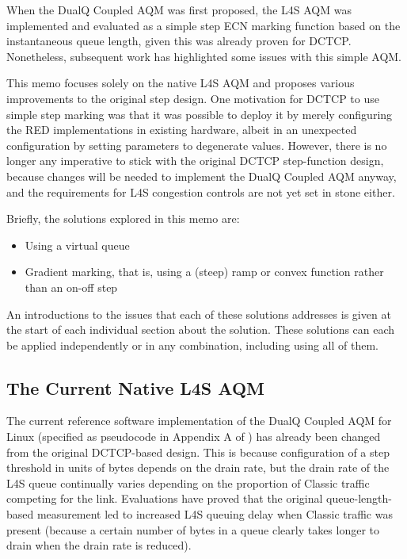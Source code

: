 When the DualQ Coupled AQM was first proposed, the L4S AQM was implemented and evaluated as a simple step ECN marking function based on the instantaneous queue length, given this was already proven for DCTCP. Nonetheless, subsequent work has highlighted some issues with this simple AQM. 

This memo focuses solely on the native L4S AQM and proposes various improvements to the original step design. One motivation for DCTCP to use simple step marking was that it was possible to deploy it by merely configuring the RED implementations in existing hardware, albeit in an unexpected configuration by setting parameters to degenerate values. However, there is no longer any imperative to stick with the original DCTCP step-function design, because changes will be needed to implement the DualQ Coupled AQM anyway, and the requirements for L4S congestion controls are not yet set in stone either.

Briefly, the solutions explored in this memo are:
\begin{itemize}
	\item Using a virtual queue
	\item Gradient marking, that is, using a (steep) ramp or convex function rather than an on-off step
\end{itemize}

An introductions to the issues that each of these solutions addresses is given at the start of each individual section about the solution. These solutions can each be applied independently or in any combination, including using all of them.

\subsection{The Current Native L4S AQM}\label{l4saqmtr_current}

The current reference software implementation of the DualQ Coupled AQM for Linux (specified as pseudocode in Appendix A of \cite{Briscoe15e:DualQ-Coupled-AQM_ID}) has already been changed from the original DCTCP-based design. This is because configuration of a step threshold in units of bytes depends on the drain rate, but the drain rate of the L4S queue continually varies depending on the proportion of Classic traffic competing for the link. Evaluations have proved that the original queue-length-based measurement led to increased L4S queuing delay when Classic traffic was present (because a certain number of bytes in a queue clearly takes longer to drain when the drain rate is reduced).


